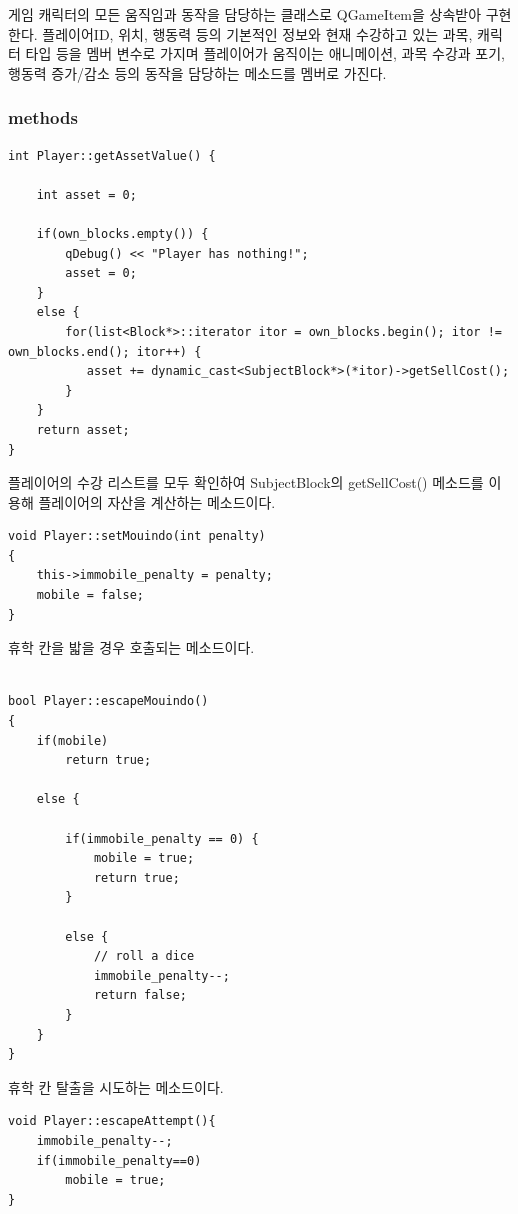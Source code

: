 \documentclass[10pt,oneside,a4paper,titlepage]{article}
\begin{document}
게임 캐릭터의 모든 움직임과 동작을 담당하는 클래스로 QGameItem을 상속받아 구현한다. 플레이어ID, 위치, 행동력 등의 기본적인 정보와 현재 수강하고 있는 과목, 캐릭터 타입 등을 멤버 변수로 가지며 플레이어가 움직이는 애니메이션, 과목 수강과 포기, 행동력 증가/감소 등의 동작을 담당하는 메소드를 멤버로 가진다.

\subsubsection{methods}

\begin{lstlisting}
int Player::getAssetValue() {

    int asset = 0;

    if(own_blocks.empty()) {
        qDebug() << "Player has nothing!";
        asset = 0;
    }
    else {
        for(list<Block*>::iterator itor = own_blocks.begin(); itor != own_blocks.end(); itor++) {
           asset += dynamic_cast<SubjectBlock*>(*itor)->getSellCost();
        }
    }
    return asset;
}
\end{lstlisting}

플레이어의 수강 리스트를 모두 확인하여 SubjectBlock의 getSellCost() 메소드를 이용해 플레이어의 자산을 계산하는 메소드이다.

\begin{lstlisting}
void Player::setMouindo(int penalty)
{
    this->immobile_penalty = penalty;
    mobile = false;
}
\end{lstlisting}

휴학 칸을 밟을 경우 호출되는 메소드이다. \\

\begin{lstlisting}

bool Player::escapeMouindo()
{
    if(mobile)
        return true;

    else {

        if(immobile_penalty == 0) {
            mobile = true;
            return true;
        }

        else {
            // roll a dice
            immobile_penalty--;
            return false;
        }
    }
}

\end{lstlisting}

휴학 칸 탈출을 시도하는 메소드이다. \\


\begin{lstlisting}
void Player::escapeAttempt(){
    immobile_penalty--;
    if(immobile_penalty==0)
        mobile = true;
}
\end{lstlisting}
\end{document}
